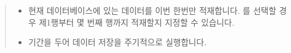 \documentclass[letterpaper,10pt,english]{sphinxmanual}
\begin{document}
\begin{enumerate}
\begin{quote}
\begin{figure}[H]
\noindent{}
\end{figure}
\begin{itemize}
\item {} 
 현재 데이터베이스에 있는 데이터를 이번 한번만 적재합니다. 를 선택할 경우 제1행부터 몇 번째 행까지 적재할지 지정할 수 있습니다.
\begin{quote}

\begin{figure}[H]
\centering

\noindent{}
\end{figure}
\end{quote}

\item {} 
 기간을 두어 데이터 저장을 주기적으로 실행합니다.
\begin{quote}

\begin{figure}[H]
\centering

\noindent{}
\end{figure}
\end{quote}

\end{itemize}
\end{quote}

\end{enumerate}
\end{document}
